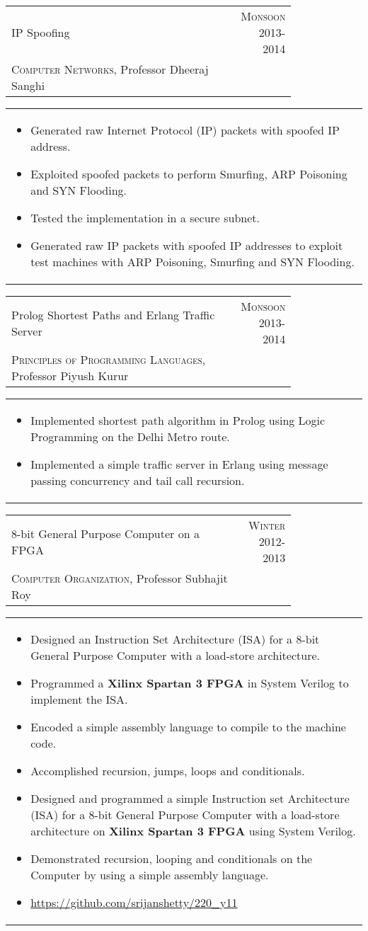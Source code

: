 \documentclass[a4paper,10pt]{article} %
\newcommand{\lproject}[4]{
    \begin{tabular}{p{0.80\linewidth}r}
        \textcolor{NavyBlue}{#2} & \multicolumn{1}{m{4cm}}{\raggedleft \textsc{#1}}\\
        #3
    \end{tabular}
    \begin{tabular}{p{\linewidth}}
    \vspace{-0.3cm}
        \footnotesize{#4}
    \end{tabular}
    \vspace{-0.5cm}
}
\begin{document}
\lproject {Monsoon 2013-2014}
          {IP Spoofing}
          {\textsc{Computer Networks}, Professor Dheeraj Sanghi}
          {
              \begin{itemize}[leftmargin=0.5cm]
                  \item Generated raw Internet Protocol (IP) packets with spoofed IP address.
                  \item Exploited spoofed packets to perform Smurfing, ARP Poisoning and SYN Flooding.
                  \item Tested the implementation in a secure subnet.
                  \item Generated raw IP packets with spoofed IP addresses to exploit test machines with ARP Poisoning,
                      Smurfing and SYN Flooding.
              \end{itemize}
          }

\lproject {Monsoon 2013-2014}
          {Prolog Shortest Paths and Erlang Traffic Server}
          {\textsc{Principles of Programming Languages}, Professor Piyush Kurur}
          {
               \begin{itemize}[leftmargin=0.5cm]
                   \item Implemented shortest path algorithm in Prolog using Logic Programming on the Delhi Metro route.
                   \item Implemented a simple traffic server in Erlang using message passing concurrency and tail call recursion.
               \end{itemize}
           }

\lproject {Winter 2012-2013}
          {8-bit General Purpose Computer on a FPGA}
          {\textsc{Computer Organization}, Professor Subhajit Roy}
          {
              \begin{itemize}[leftmargin=0.5cm]
                  \item Designed an Instruction Set Architecture (ISA) for a 8-bit General Purpose Computer with a load-store architecture.
                  \item Programmed a \textbf{Xilinx Spartan 3 FPGA} in System Verilog to implement the ISA.
                  \item Encoded a simple assembly language to compile to the machine code.
                  \item Accomplished recursion, jumps, loops and conditionals.
                  \item Designed and programmed a simple Instruction set Architecture (ISA) for a 8-bit General Purpose Computer with a load-store
                      architecture on \textbf{Xilinx Spartan 3 FPGA} using System Verilog.
                  \item Demonstrated recursion, looping and conditionals on the Computer by using a simple assembly language.
                  \item \href{https://github.com/srijanshetty/220\_y11} {https://github.com/srijanshetty/220\_y11}
              \end{itemize}
          }
\end{document}
